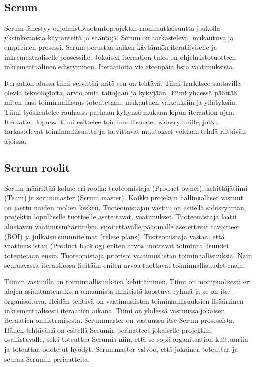 \documentclass[finnish]{tktltiki2}
\theoremstyle{definition}
\theoremstyle{remark}
\begin{document}
\subsection{Scrum}

Scrum lähestyy ohjelmistotuotantoprojektin monimutkaisuutta joukolla yksinkertaisia käytänteitä ja sääntöjä. Scrum on tarkasteleva, mukautuva ja empiirinen prosessi. Scrum perustaa kaiken käytännön iteratiiviselle ja inkrementaaliselle prosessille. Jokaisen iteraation tulos on ohjelmistotuotteen inkrementaalinen edistyminen. Iteraatioita vie eteenpäin lista vaatimuksista\cite{SCH09}. 

Iteraation alussa tiimi selvittää mitä sen on tehtävä. Tiimi harkitsee saatavilla olevia teknologioita, arvio omia taitojaan ja kykyjään. Tiimi yhdessä päättää miten uusi toiminnallisuus toteutetaan, mukautuen vaikeuksiin ja yllätyksiin. Tiimi työskentelee rauhassa parhaan kykynsä mukaan lopun iteraation ajan. Iteraation lopussa tiimi esittelee toiminnallisuuden sidosryhmille, jotka tarkastelevat toiminnallisuutta ja tarvittavat muutokset voidaan tehdä riittävän ajoissa\cite{SCH09}.

\subsection*{Scrum roolit}

Scrum määrittää kolme eri roolia: tuoteomistaja (Product owner), kehittäjätiimi (Team) ja scrummaster (Scrum master). Kaikki projektin hallinnolliset vastuut on jaettu näiden roolien kesken. Tuoteomistajan vastuu on esitellä sidosryhmän, projektin lopulliselle tuotteelle asetettavat, vaatimukset. Tuoteomistaja laatii alustavan vaatimusmäärittelyn, sijoitettavalle pääomalle asetettavat tavoitteet (ROI) ja julkaisu suunnitelmat (relese plans). Tuoteomistaja vastaa, että vaatimuslistan (Product backlog) eniten arvoa tuottavat toiminnallisuudet toteutetaan ensin. Tuoteomistaja priorisoi vaatimuslistan toiminnallisuuksia. Näin seuraavassa iteraatiossa lisätään eniten arvoa tuottavat toiminnallisuudet ensin\cite{SCH09}. 

Tiimin vastuulla on toiminnallisuuksien kehittäminen. Tiimi on monipuolisesti eri alojen asiantuntemuksen omaamista ihmisistä koostuva ryhmä ja se on itse-organisoituva. Heidän tehtävä on vaatimuslistan toiminnallisuuksien lisääminen inkrementaalisesti iteraation aikana. Tiimi on yhdessä vastuussa jokaisen iteraation onnistumisesta. Scrummaster on vastuussa itse Scrum prosessista. Hänen tehtävänä on esitellä Scrumin periaatteet jokaiselle projektiin osallistuvalle, sekä toteuttaa Scrumia niin, että se sopii organisaation kulttuuriin ja toteuttaa odotetut hyödyt. Scrummaster valvoo, että jokainen toteuttaa ja seuraa Scrumin periaatteita\cite{SCH09}.
\end{document}
